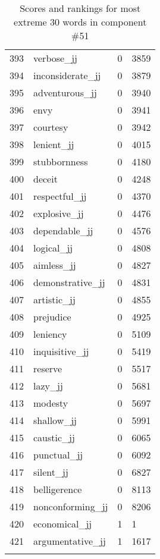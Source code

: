 \begin{longtable}[!htbp]{| rlr@{.}l |}
    393 & verbose\_jj & 0 & 3859 \\
    394 & inconsiderate\_jj & 0 & 3879 \\
    395 & adventurous\_jj & 0 & 3940 \\
    396 & envy & 0 & 3941 \\
    397 & courtesy & 0 & 3942 \\
    398 & lenient\_jj & 0 & 4015 \\
    399 & stubbornness & 0 & 4180 \\
    400 & deceit & 0 & 4248 \\
    401 & respectful\_jj & 0 & 4370 \\
    402 & explosive\_jj & 0 & 4476 \\
    403 & dependable\_jj & 0 & 4576 \\
    404 & logical\_jj & 0 & 4808 \\
    405 & aimless\_jj & 0 & 4827 \\
    406 & demonstrative\_jj & 0 & 4831 \\
    407 & artistic\_jj & 0 & 4855 \\
    408 & prejudice & 0 & 4925 \\
    409 & leniency & 0 & 5109 \\
    410 & inquisitive\_jj & 0 & 5419 \\
    411 & reserve & 0 & 5517 \\
    412 & lazy\_jj & 0 & 5681 \\
    413 & modesty & 0 & 5697 \\
    414 & shallow\_jj & 0 & 5991 \\
    415 & caustic\_jj & 0 & 6065 \\
    416 & punctual\_jj & 0 & 6092 \\
    417 & silent\_jj & 0 & 6827 \\
    418 & belligerence & 0 & 8113 \\
    419 & nonconforming\_jj & 0 & 8206 \\
    420 & economical\_jj & 1 & 1 \\
    421 & argumentative\_jj & 1 & 1617 \\
    \hline
    \caption{Scores and rankings for most extreme 30 words in component \#51} \\
\end{longtable}
